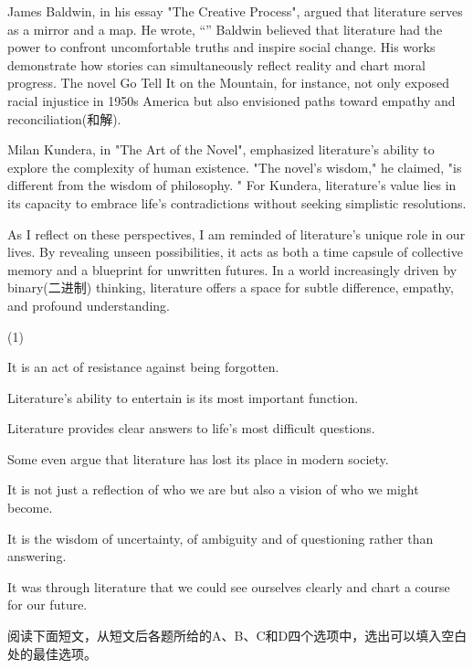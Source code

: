 \documentclass{英语试卷}
\begin{document}
\par James Baldwin, in his essay "The Creative Process", argued that literature serves as a mirror and a map. He wrote, “” Baldwin believed that literature had the power to confront uncomfortable truths and inspire social change. His works demonstrate how stories can simultaneously reflect reality and chart moral progress. The novel Go Tell It on the Mountain, for instance, not only exposed racial injustice in 1950s America but also envisioned paths toward empathy and reconciliation(和解).\par
\par Milan Kundera, in "The Art of the Novel", emphasized literature's ability to explore the complexity of human existence. "The novel's wisdom," he claimed, "is different from the wisdom of philosophy. " For Kundera, literature's value lies in its capacity to embrace life's contradictions without seeking simplistic resolutions.\par
\par As I reflect on these perspectives, I am reminded of literature's unique role in our lives.  By revealing unseen possibilities, it acts as both a time capsule of collective memory and a blueprint for unwritten futures. In a world increasingly driven by binary(二进制) thinking, literature offers a space for subtle difference, empathy, and profound understanding.\par
\begin{choices}(1)
  \item It is an act of resistance against being forgotten.
  \item Literature's ability to entertain is its most important function.
  \item Literature provides clear answers to life's most difficult questions.
  \item Some even argue that literature has lost its place in modern society.
  \item It is not just a reflection of who we are but also a vision of who we might become.
  \item It is the wisdom of uncertainty, of ambiguity and of questioning rather than answering.
  \item It was through literature that we could see ourselves clearly and chart a course for our future.
\end{choices}
\par 阅读下面短文，从短文后各题所给的A、B、C和D四个选项中，选出可以填入空白处的最佳选项。\par
\end{document}
